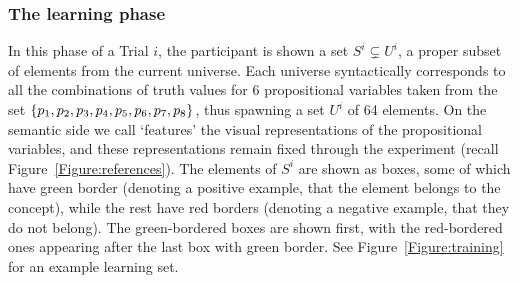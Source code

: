 \subsubsection{The learning phase}\label{Subsection:learning}
In this phase of a Trial $i$, the participant is shown a set $S^i \subsetneq U^i$, a proper subset of elements from the current universe. Each universe syntactically corresponds to all the combinations of truth values for 6 propositional variables taken from the set $\{p_1, p_2, p_3, p_4, p_5, p_6, p_7, p_8\}$, thus spawning a set $U^i$ of 64 elements. On the semantic side we call `features' the visual representations of the propositional variables, and these representations remain fixed through the experiment (recall Figure~\ref{Figure:references}).
The elements of $S^i$ are shown as boxes, some of which have green border (denoting a positive example, that the element belongs to the concept), while the rest have red borders (denoting a negative example, that they do not belong).
The green-bordered boxes are shown first, with the red-bordered ones appearing after the last box with green border. 
See Figure~\ref{Figure:training} for an example learning set. 

